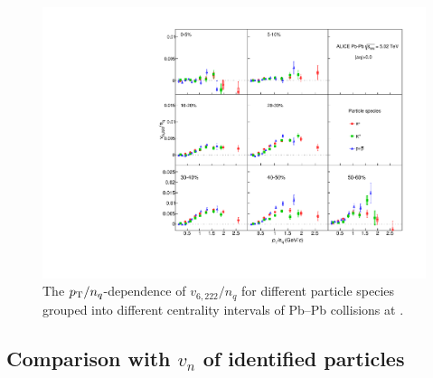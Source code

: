 \begin{figure}[!htb]
\begin{center}
\includegraphics[scale=0.82]{figures/scaling/All_v6222_gap00_NCQ_3by3.pdf}

\end{center}
\caption{The $p_{\rm{T}}/n_{q}$-dependence of $v_{6,222}/n_{q}$ for different particle species grouped into different centrality intervals of Pb--Pb collisions at \sNN.}
\label{v6222_NCQ}
\end{figure}


\subsection{Comparison with $v_{n}$ of identified particles}
\label{SubSec:comparewithvn}


